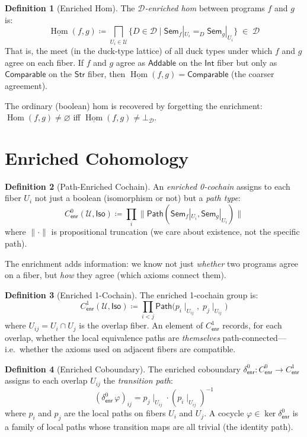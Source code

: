 \documentclass[11pt,a4paper]{report}
\theoremstyle{definition}
\newtheorem{definition}{Definition}[chapter]
\theoremstyle{plain}
\newcommand{\Path}{\mathsf{Path}}
\newcommand{\covers}{\mathcal{U}}
\newcommand{\Sem}{\mathsf{Sem}}
\newcommand{\Iso}{\mathsf{Iso}}
\newcommand{\restr}[2]{#1\!\!\mid_{#2}}
\DeclareMathOperator{\Hom}{Hom}
\begin{document}
\begin{definition}[Enriched Hom]
\label{def:enriched-hom}
The \emph{$\mathcal{D}$-enriched hom} between programs $f$ and $g$ is:
\[
  \underline{\Hom}(f,g) \coloneqq \bigsqcap_{U_i \in \covers}
    \{D \in \mathcal{D} \mid
    \Sem_f|_{U_i} =_D \Sem_g|_{U_i}\} \;\in\; \mathcal{D}
\]
That is, the meet (in the duck-type lattice) of all duck types under
which $f$ and $g$ agree on each fiber.  If $f$ and $g$ agree as
$\mathsf{Addable}$ on the $\mathsf{Int}$ fiber but only as
$\mathsf{Comparable}$ on the $\mathsf{Str}$ fiber, then
$\underline{\Hom}(f,g) = \mathsf{Comparable}$ (the coarser agreement).
\end{definition}

The ordinary (boolean) hom is recovered by forgetting the enrichment:
$\Hom(f,g) \neq \varnothing$ iff
$\underline{\Hom}(f,g) \neq \bot_{\mathcal{D}}$.

\section{Enriched Cohomology}

\begin{definition}[Path-Enriched Cochain]
An \emph{enriched 0-cochain} assigns to each fiber $U_i$ not just a
boolean (isomorphism or not) but a \emph{path type}:
\[
  C^0_\mathsf{enr}(\covers, \Iso) \coloneqq \prod_i
    \|\Path(\Sem_f|_{U_i}, \Sem_g|_{U_i})\|
\]
where $\|\cdot\|$ is propositional truncation (we care about
existence, not the specific path).
\end{definition}

The enrichment adds information: we know not just \emph{whether} two
programs agree on a fiber, but \emph{how} they agree (which axioms
connect them).

\begin{definition}[Enriched 1-Cochain]
The enriched 1-cochain group is:
\[
  C^1_\mathsf{enr}(\covers, \Iso) \coloneqq \prod_{i < j}
    \Path\bigl(\restr{p_i}{U_{ij}},\; \restr{p_j}{U_{ij}}\bigr)
\]
where $U_{ij} = U_i \cap U_j$ is the overlap fiber.  An element of
$C^1_\mathsf{enr}$ records, for each overlap, whether the local
equivalence paths are \emph{themselves} path-connected---i.e.\
whether the axioms used on adjacent fibers are compatible.
\end{definition}

\begin{definition}[Enriched Coboundary]
The enriched coboundary $\delta^0_\mathsf{enr} : C^0_\mathsf{enr}
\to C^1_\mathsf{enr}$ assigns to each overlap $U_{ij}$ the
\emph{transition path}:
\[
  (\delta^0_\mathsf{enr}\, \varphi)_{ij} = \restr{p_j}{U_{ij}}
    \cdot (\restr{p_i}{U_{ij}})^{-1}
\]
where $p_i$ and $p_j$ are the local paths on fibers $U_i$ and $U_j$.
A cocycle $\varphi \in \ker \delta^0_\mathsf{enr}$ is a family of
local paths whose transition maps are all trivial (the identity path).
\end{definition}
\end{document}
